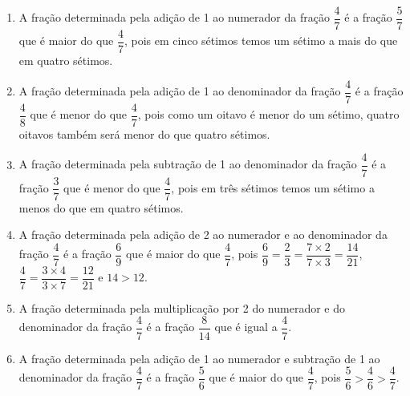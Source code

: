 \documentclass[10 pt,usenames,dvipsnames, oneside]{article}
\begin{document}
\ifdefined\prof
\begin{solucao}

\begin{enumerate} %
\item       A fração determinada pela adição de 1 ao numerador da fração
$\dfrac{4}{7}$       é a fração       $\dfrac{5}{7}$       que é maior do que
$\dfrac{4}{7}$, pois em cinco sétimos temos um sétimo a mais do que em quatro
sétimos.

\item       A fração determinada pela adição de 1 ao denominador da fração
$\dfrac{4}{7}$       é a fração       $\dfrac{4}{8}$       que é menor do que
$\dfrac{4}{7}$, pois como um oitavo é menor do um sétimo, quatro oitavos
também será menor do que quatro sétimos.
\item       A fração determinada pela subtração de 1 ao denominador da
fração       $\dfrac{4}{7}$       é a fração       $\dfrac{3}{7}$       que é
menor do que       $\dfrac{4}{7}$, pois em três sétimos temos um sétimo a menos
do que em quatro sétimos.
\item       A fração determinada pela adição de 2 ao numerador e ao
denominador da fração       $\dfrac{4}{7}$       é a fração       $\dfrac{6}{9}$
que é maior do que       $\dfrac{4}{7}$, pois       $\dfrac{6}{9} =
\dfrac{2}{3} = \dfrac{7 \times 2}{7 \times 3} = \dfrac{14}{21}$,       $\dfrac{4}{7}
= \dfrac{3 \times 4}{3 \times 7} = \dfrac{12}{21}$       e       $14 > 12$.
\item       A fração determinada pela multiplicação por 2 do numerador e do
denominador da fração       $\dfrac{4}{7}$       é a fração       $\dfrac{8}{14}$
que é igual a       $\dfrac{4}{7}$.
\item       A fração determinada pela adição de 1 ao numerador e subtração
de 1 ao denominador da fração       $\dfrac{4}{7}$       é a fração
$\dfrac{5}{6}$       que é maior do que       $\dfrac{4}{7}$, pois
$\dfrac{5}{6} > \dfrac{4}{6} > \dfrac{4}{7}$.
\end{enumerate} %

\end{solucao}
\fi
\end{document}
